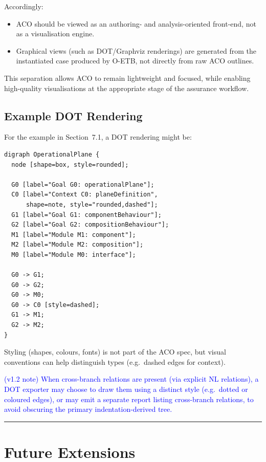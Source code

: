 \documentclass[11pt]{article}
\begin{document}
Accordingly:
\begin{itemize}[leftmargin=2em]
  \item ACO should be viewed as an authoring- and analysis-oriented front-end,
        not as a visualisation engine.
  \item Graphical views (such as DOT/Graphviz renderings) are generated from the
        instantiated case produced by O-ETB, not directly from raw ACO outlines.
\end{itemize}

This separation allows ACO to remain lightweight and focused, while enabling
high-quality visualisations at the appropriate stage of the assurance workflow.

\subsection{Example DOT Rendering}

For the example in Section~7.1, a DOT rendering might be:

\begin{verbatim}
digraph OperationalPlane {
  node [shape=box, style=rounded];

  G0 [label="Goal G0: operationalPlane"];
  C0 [label="Context C0: planeDefinition",
      shape=note, style="rounded,dashed"];
  G1 [label="Goal G1: componentBehaviour"];
  G2 [label="Goal G2: compositionBehaviour"];
  M1 [label="Module M1: component"];
  M2 [label="Module M2: composition"];
  M0 [label="Module M0: interface"];

  G0 -> G1;
  G0 -> G2;
  G0 -> M0;
  G0 -> C0 [style=dashed];
  G1 -> M1;
  G2 -> M2;
}
\end{verbatim}

Styling (shapes, colours, fonts) is not part of the ACO spec, but visual conventions can help distinguish types (e.g.\ dashed edges for context).

\textcolor{blue}{(v1.2 note) When cross-branch relations are present (via explicit NL relations), a DOT exporter may choose to draw them using a distinct style (e.g.\ dotted or coloured edges), or may emit a separate report listing cross-branch relations, to avoid obscuring the primary indentation-derived tree.}

\bigskip
\hrule
\bigskip

\section{Future Extensions}
\label{sec:future-extensions}
\end{document}
